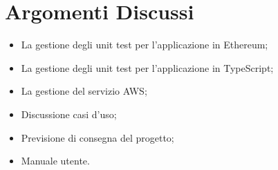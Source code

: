 \section{Argomenti Discussi}
	\begin{itemize}
		\item La gestione degli unit test per l'applicazione in Ethereum;
		\item La gestione degli unit test per l'applicazione in TypeScript;
		\item La gestione del servizio AWS;
		\item Discussione casi d'uso;
		\item Previsione di consegna del progetto;
		\item Manuale utente.
	\end{itemize}
